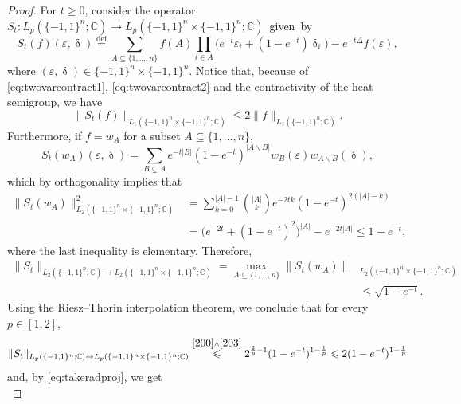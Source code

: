 \documentclass[11pt,reqno]{amsart}
\renewcommand{\leq}{\leqslant}
\renewcommand{\geq}{\geqslant}
\renewcommand{\setminus}{\smallsetminus}
\newcommand{\e}{\varepsilon}
\newcommand{\1}{\mathbf 1}
\theoremstyle{remark}
\newcommand{\C}{\mathbb C}
\newcommand{\eqdef}{\stackrel{\mathrm{def}}{=}}
\renewcommand{\delta}{\updelta}
\begin{document}
\begin{proof}
For $t\geq0$, consider the operator\mbox{ $S_t:L_p(\{-1,1\}^n;\C) \to L_p(\{-1,1\}^n\times\{-1,1\}^n;\C)$ given by}
\begin{equation}
S_t(f)(\e,\delta) \eqdef \sum_{A\subseteq\{1,\ldots,n\}} \widehat{f}(A) \prod_{i\in A} \big(e^{-t}\e_i + (1-e^{-t})\delta_i\big) - e^{-t\Delta} f(\e),
\end{equation}
where $(\e,\delta)\in\{-1,1\}^n\times\{-1,1\}^n$. Notice that, because of \eqref{eq:twovarcontract1}, \eqref{eq:twovarcontract2} and the contractivity of the heat semigroup, we have
\begin{equation} \label{200}
\|S_t(f)\|_{L_1(\{-1,1\}^n\times\{-1,1\}^n;\C)} \leq 2\|f\|_{L_1(\{-1,1\}^n;\C)}.
\end{equation}
Furthermore, if $f=w_A$ for a subset $A\subseteq\{1,\ldots,n\}$,
\begin{equation}
S_t(w_A)(\e,\delta) = \sum_{B\subsetneq A} e^{-t|B|} (1-e^{-t})^{|A\setminus B|}w_B(\e) w_{A\setminus B}(\delta),
\end{equation}
which by orthogonality implies that
\begin{equation}
\begin{split}
\|S_t(w_A)\|^2_{L_2(\{-1,1\}^n\times\{-1,1\}^n;\C)} & = \sum_{k=0}^{|A|-1} \binom{|A|}{k} e^{-2tk}(1-e^{-t})^{2(|A|-k)}
\\ & = \big(e^{-2t}+(1-e^{-t})^2\big)^{|A|} - e^{-2t|A|} \leq 1-e^{-t},
\end{split}
\end{equation}
where the last inequality is elementary. Therefore,
\begin{equation} \label{203}
\begin{split}
\|S_t\|_{{L_2(\{-1,1\}^n;\C)}\to L_2(\{-1,1\}^n\times\{-1,1\}^n;\C)} = \max_{A\subseteq\{1,\ldots,n\}} \|S_t(w_A)\|&_{L_2(\{-1,1\}^n\times\{-1,1\}^n;\C)}\\ & \leq \sqrt{1-e^{-t}}.
\end{split}
\end{equation}
Using the Riesz--Thorin interpolation theorem, we conclude that for every $p\in[1,2]$,
\begin{equation} \label{eq:gotdecay}
\|S_t\|_{{L_p(\{-1,1\}^n;\C)}\to L_p(\{-1,1\}^n\times\{-1,1\}^n;\C)} \stackrel{\eqref{200}\wedge\eqref{203}}{\leq} 2^{\frac{2}{p}-1} (1-e^{-t})^{1-\frac{1}{p}} \leq 2(1-e^{-t})^{1-\frac{1}{p}}
\end{equation}
and, by \eqref{eq:takeradproj}, we get
\begin{equation} \label{eq:almostthere!}

\end{equation}
\end{proof}
\end{document}
